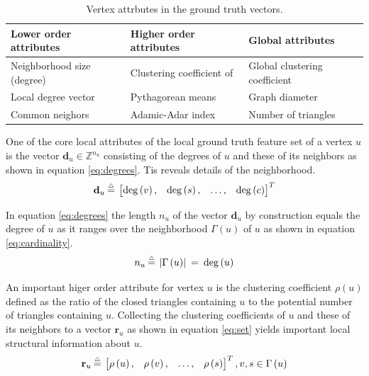 \documentclass[conference, compsoc, final]{IEEEtran}
\DeclareMathOperator{\bmdegop}{deg}
\newcommand{\bmdef}{{\buildrel{{\mathsmaller{\triangle}}}\over{=}}}
\newcommand{\bmparen}[1]{\left({#1}\right)}
\newcommand{\bmvec}[1]{\mathbf{#1}}
\newcommand{\bmtranspose}{T}
\newcommand{\bmcardinality}[1]{\left\lvert{#1}\right\rvert}
\newcommand{\bmneighb}[1]{\Gamma\left(#1\right)}
\newcommand{\bmdeg}[1]{\bmdegop\left({#1}\right)}
\begin{document}
\begin{table}[thbp]
\centering%
\caption{Vertex attrbutes in the ground truth vectors.}
\label{tab:attrib}
    \begin{tabular}{lll}
    \hline
    \textbf{Lower order attributes}  &  \textbf{Higher order attributes}  &  \textbf{Global attributes}  \\
    \hline
    Neighborhood size (degree)  &  Clustering coefficient of   &  Global clustering coefficient  \\
    Local degree vector  &   Pythagorean means  &  Graph diameter  \\
    Common neighors  &  Adamic-Adar index  &  Number of triangles  \\
    \hline
    \end{tabular}
\end{table}

One of the core local attributes of the local ground truth feature set of a vertex $u$ is the vector $\bmvec{d}_u \in \mathbb{Z}^{n_u}$ consisting of the degrees of $u$ and these of its neighbors as shown in equation \eqref{eq:degrees}. Tis reveals details of the neighborhood.
\begin{equation}
\bmvec{d}_u  \:\bmdef\:
\begin{bmatrix}
    \bmdeg{v}, & \bmdeg{s}, &  \ldots, &  \bmdeg{c}
\end{bmatrix}^\bmtranspose
\label{eq:degrees}
\end{equation}

In equation \eqref{eq:degrees} the length $n_u$ of the vector $\bmvec{d}_u$ by construction equals the degree of $u$ as it ranges over the neighborhood $\bmneighb{u}$ of $u$ as shown in equation \eqref{eq:cardinality}.
\begin{equation}
n_u  \:\bmdef\:
    \bmcardinality{\bmneighb{u}}  \:=\:
    \bmdeg{u}
\label{eq:cardinality}
\end{equation}

An important higer order attribute for vertex $u$ is the clustering coefficient $\rho\bmparen{u}$ defined as the ratio of the closed triangles containing $u$ to the potential number of triangles containing $u$. Collecting the clustering coefficients of $u$ and these of its neighbors to a vector $\bmvec{r}_u$ as shown in equation \eqref{eq:set} yields important local structural information about $u$. 
\begin{equation}
\bmvec{r}_u  \:\bmdef\:
\begin{bmatrix}
    \rho\bmparen{u}, &  \rho\bmparen{v}, &  \ldots, &  \rho\bmparen{s}
\end{bmatrix}^\bmtranspose
,v, s \in \bmneighb{u}
\label{eq:set}
\end{equation} 
\end{document}
